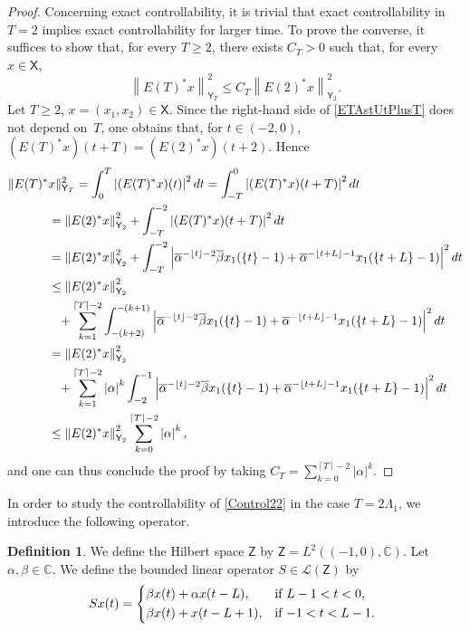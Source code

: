 \documentclass[10pt]{article}
\theoremstyle{plain}
\theoremstyle{definition}
\newtheorem{defi}[theo]{Definition}
\newcommand{\norm}[1]{\left\lVert #1\right\lVert}
\newcommand{\abs}[1]{\left\lvert #1\right \rvert}
\newcommand{\floor}[1]{\left\lfloor #1 \right\rfloor}
\newcommand{\ceil}[1]{\left\lceil #1 \right\rceil}
\numberwithin{equation}{section}\numberwithin{figure}{section}\emergencystretch=3em
\begin{document}
\begin{proof}
Concerning exact controllability, it is trivial that exact controllability in $T = 2$ implies exact controllability for larger time. To prove the converse, it suffices to show that, for every $T \geq 2$, there exists $C_T > 0$ such that, for every $x \in \mathsf X$,
\[
\norm{E(T)^\ast x}_{\mathsf Y_T}^2 \leq C_T \norm{E(2)^\ast x}_{\mathsf Y_2}^2.
\]
Let $T \geq 2$, $x = (x_1, x_2) \in \mathsf X$. Since the right-hand side of \eqref{ETAstUtPlusT} does not depend on~$T$, one obtains that, for $t \in (-2, 0)$, $(E(T)^\ast x)(t + T) = (E(2)^\ast x)(t + 2)$. Hence
\begin{align*}
\Vert E(T)^\ast& x\Vert_{\mathsf Y_T}^2  = \int_0^T \abs{(E(T)^\ast x)(t)}^2 dt = \int_{-T}^0 \abs{(E(T)^\ast x)(t + T)}^2 dt  \\
& = \norm{E(2)^\ast x}_{\mathsf Y_2}^2 + \int_{-T}^{-2} \abs{(E(T)^\ast x)(t + T)}^2 dt  \\
& = \norm{E(2)^\ast x}_{\mathsf Y_2}^2 + \int_{-T}^{-2} \abs{\overline\alpha^{-\floor{t} - 2} \overline\beta x_1(\{t\} - 1) + \overline\alpha^{-\floor{t + L} - 1} x_1(\{t + L\} - 1)}^2 dt  \\
& \leq \norm{E(2)^\ast x}_{\mathsf Y_2}^2 \\
& \hphantom{\leq} {} + \sum_{k=1}^{\ceil{T} - 2} \int_{-(k+2)}^{-(k+1)} \abs{\overline\alpha^{-\floor{t} - 2} \overline\beta x_1(\{t\} - 1) + \overline\alpha^{-\floor{t + L} - 1} x_1(\{t + L\} - 1)}^2 dt  \\
& = \norm{E(2)^\ast x}_{\mathsf Y_2}^2 \\
& \hphantom{=} {} + \sum_{k=1}^{\ceil{T} - 2} \abs{\alpha}^k \int_{-2}^{-1} \abs{\overline\alpha^{-\floor{t} - 2} \overline\beta x_1(\{t\} - 1) + \overline\alpha^{-\floor{t + L} - 1} x_1(\{t + L\} - 1)}^2 dt  \\
& \leq \norm{E(2)^\ast x}_{\mathsf Y_2}^2 \sum_{k=0}^{\ceil{T} - 2} \abs{\alpha}^k,
\end{align*}
and one can thus conclude the proof by taking $C_T = \sum_{k=0}^{\ceil{T} - 2} \abs{\alpha}^k$.
\end{proof}

In order to study the controllability of \eqref{Control22} in the case $T = 2 \Lambda_1$, we introduce the following operator.

\begin{defi}
\label{DefinitionS}
We define the Hilbert space $\mathsf Z$ by $\mathsf Z = L^2((-1, 0), \mathbb C)$. Let $\alpha, \beta \in \mathbb C$. We define the bounded linear operator $S \in \mathcal L(\mathsf Z)$ by
\begin{equation}
\label{DefS}
S x(t) =
\begin{dcases*}
\beta x(t) + \alpha x(t - L), & if $L - 1 < t < 0$, \\
\beta x(t) + x(t - L + 1), & if $-1 < t < L - 1$.
\end{dcases*}
\end{equation}
\end{defi}
\end{document}
